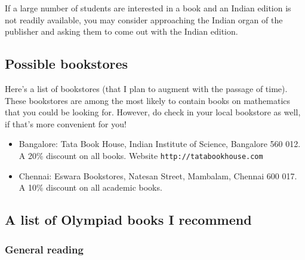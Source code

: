 \documentclass[a4paper]{amsart}
\begin{document}
If a large number of students are interested in a book and an Indian edition is not readily available, you may consider approaching the
Indian organ of the publisher and asking them to come out with the Indian edition.

\subsection{Possible bookstores}

Here's a list of bookstores (that I plan to augment with the passage of time). These bookstores are among the most likely
to contain books on mathematics that you could be looking for. However, do check in your local bookstore as well, if that's more
convenient for you!

\begin{itemize}

\item Bangalore: Tata Book House, Indian Institute of Science, Bangalore 560 012. 
  A 20\% discount on all books.
  Website {\tt http://tatabookhouse.com}

\item Chennai: Eswara Bookstores, Natesan Street, Mambalam, Chennai 600 017.
  A 10\% discount on all academic books.
\end{itemize}

\subsection{A list of Olympiad books I recommend}

\subsubsection{General reading}
\end{document}
